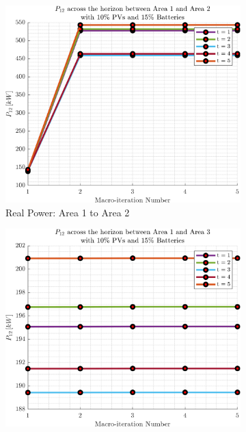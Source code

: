 \documentclass[../../outputs/main.tex]{subfiles}
\begin{document}
\begin{figure}[h!]
    \centering
    \begin{subfigure}[b]{0.3\textwidth}
        \centering
        \includegraphics[width=\textwidth]{../figures/T5-pv10-batt15-PBoundary/BoundaryRealPower_vs_t_vs_macroItr_5Areas_1_2_genCost_pv_10_batt_15_.png}
        \caption{\scriptsize Real Power: Area 1 to Area 2}
        \label{fig:real_power_1_2}
    \end{subfigure}
    \hfill
    \begin{subfigure}[b]{0.3\textwidth}
        \centering
        \includegraphics[width=\textwidth]{../figures/T5-pv10-batt15-PBoundary/BoundaryRealPower_vs_t_vs_macroItr_5Areas_1_3_genCost_pv_10_batt_15_.png}

\end{subfigure}
\end{figure}
\end{document}
